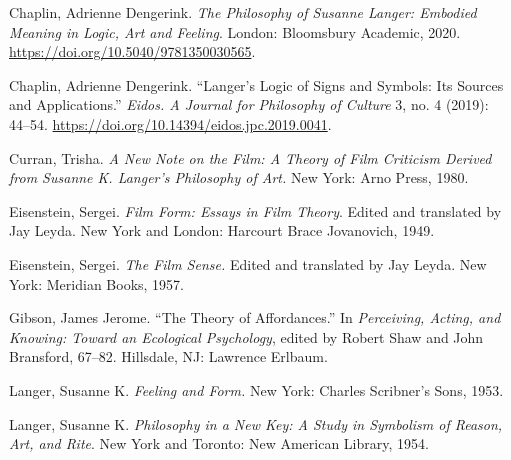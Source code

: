 \documentclass{tufte-handout}
\begin{document}
\begin{hangparas}{.25in}{1} 



Chaplin, Adrienne Dengerink. \emph{The Philosophy of Susanne Langer:
Embodied Meaning in Logic, Art and Feeling}. London: Bloomsbury
Academic, 2020. \url{https://doi.org/10.5040/9781350030565}.

Chaplin, Adrienne Dengerink. ``Langer's Logic of Signs and Symbols: Its
Sources and Applications.'' \emph{Eidos. A Journal for Philosophy of
Culture} 3, no. 4 (2019): 44--54.
\url{https://doi.org/10.14394/eidos.jpc.2019.0041}.

Curran, Trisha. \emph{A New Note on the Film: A Theory of Film Criticism
Derived from Susanne K. Langer's Philosophy of Art.} New York: Arno
Press, 1980.

Eisenstein, Sergei. \emph{Film Form: Essays in Film Theory}. Edited and
translated by Jay Leyda. New York and London: Harcourt Brace Jovanovich,
1949.

Eisenstein, Sergei. \emph{The Film Sense.} Edited and translated by Jay
Leyda. New York: Meridian Books, 1957.

Gibson, James Jerome. ``The Theory of Affordances.'' In
\emph{Perceiving, Acting, and Knowing: Toward an Ecological Psychology},
edited by Robert Shaw and John Bransford, 67--82. Hillsdale, NJ:
Lawrence Erlbaum.

Langer, Susanne K. \emph{Feeling and Form.} New York: Charles Scribner's
Sons, 1953.

Langer, Susanne K. \emph{Philosophy in a New Key: A Study in Symbolism
of Reason, Art, and Rite}. New York and Toronto: New American Library,
1954.



\end{hangparas}
\end{document}
